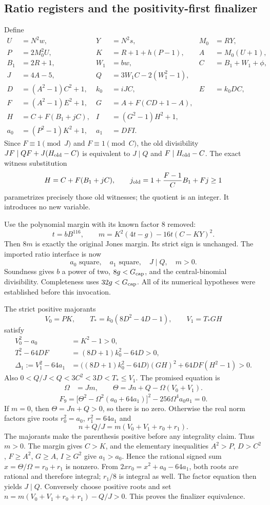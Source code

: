 \subsection{Ratio registers and the positivity-first finalizer}
Define
\begin{align*}
 U&=N^2w,&Y&=N^2s,&M_0&=RY,\\
 P&=2M_0^2U,&K&=R+1+h(P-1),&A&=M_0(U+1),\\
 B_1&=2R+1,&W_1&=bw,&C&=B_1+W_1+\phi,\\
 J&=4A-5,&Q&=3W_1C-2(W_1^2-1),\\
 D&=(A^2-1)C^2+1,&k_0&=iJC,&E&=k_0DC,\\
 F&=(A^2-1)E^2+1,&G&=A+F(CD+1-A),\\
 H&=C+F(B_1+jC),&I&=(G^2-1)H^2+1,\\
 a_0&=(P^2-1)K^2+1,&a_1&=DFI.
\end{align*}
Since \(F\equiv1\pmod J\) and \(F\equiv1\pmod C\), the old
divisibility \(JF\mid QF+J(H_{\rm old}-C)\) is equivalent to
\(J\mid Q\) and \(F\mid H_{\rm old}-C\).  The exact witness substitution
\[
 H=C+F(B_1+jC),\qquad
 j_{\rm old}=1+\frac{F-1}{C}B_1+Fj\ge1
\]
parametrizes precisely those old witnesses; the quotient is an integer.
It introduces no new variable.

Use the polynomial margin with its known factor 8 removed:
\[
 t=bB^{116},\qquad
 m=K^2(4t-g)-16t(C-KY)^2.
\]
Then \(8m\) is exactly the original Jones margin.  Its strict sign is
unchanged.  The imported ratio interface is now
\[
 a_0\text{ square},\quad a_1\text{ square},\quad J\mid Q,\quad m>0.
\]
Soundness gives \(b\) a power of two, \(8g<G_{\rm cap}\), and the
central-binomial divisibility.  Completeness uses \(32g<G_{\rm cap}\).
All of its numerical hypotheses were established before this invocation.

The strict positive majorants
\[
 V_0=PK,\qquad T_*=k_0(8D^2-4D-1),\qquad V_1=T_*GH
\]
satisfy
\begin{align*}
 V_0^2-a_0&=K^2-1>0,\\
 T_*^2-64DF&=(8D+1)k_0^2-64D>0,\\
 \Delta_1:=V_1^2-64a_1
 &=\bigl((8D+1)k_0^2-64D\bigr)(GH)^2
   +64DF(H^2-1)>0.
\end{align*}
Also \(0<Q/J<Q<3C^2<3D<T_*\le V_1\).  The promised equation is
\begin{align*}
 \Omega&=Jm,\qquad
 \Theta=Jn+Q-\Omega(V_0+V_1).
\end{align*}
\[
 \boxed{F_9=\bigl[\Theta^2-\Omega^2(a_0+64a_1)\bigr]^2
              -256\Omega^4a_0a_1=0.}
\]
If \(m=0\), then \(\Theta=Jn+Q>0\), so there is no zero.  Otherwise
the real norm factors give roots \(r_0^2=a_0\), \(r_1^2=64a_1\) and
\[
 n+Q/J=m(V_0+V_1+r_0+r_1).
\]
The majorants make the parenthesis positive before any integrality claim.
Thus \(m>0\).  The margin gives \(C>K\), and the elementary inequalities
\(A^2>P\), \(D>C^2\), \(F\ge A^2\), \(G\ge A\), \(I\ge G^2\)
give \(a_1>a_0\).  Hence the rational signed sum
\(x=\Theta/\Omega=r_0+r_1\) is nonzero.  From
\(2xr_0=x^2+a_0-64a_1\), both roots are rational and therefore integral;
\(r_1/8\) is integral as well.  The factor equation then yields \(J\mid Q\).
Conversely choose positive roots and set
\(n=m(V_0+V_1+r_0+r_1)-Q/J>0\).  This proves the finalizer equivalence.

